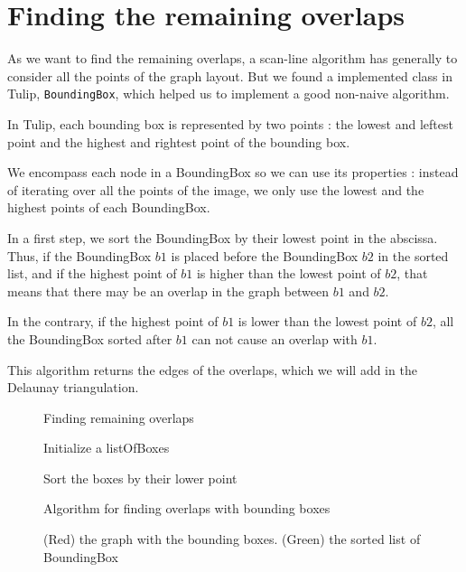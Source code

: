 \documentclass[12pt]{report}
\begin{document}
\section{Finding the remaining overlaps}
As we want to find the remaining overlaps, a scan-line algorithm has generally to consider all the points of the graph layout. But we found a implemented class in Tulip, \texttt{BoundingBox}, which helped us to implement a good non-naive algorithm. 

\bigskip
In Tulip, each bounding box is represented by two points : the lowest and leftest point and the highest and rightest point of the bounding box.

We encompass each node in a BoundingBox so we can use its properties : instead of iterating over all the points of the image, we only use the lowest and the highest points of each BoundingBox. 

\bigskip
In a first step, we sort the BoundingBox by their lowest point in the abscissa. Thus, if the BoundingBox $b1$ is placed before the BoundingBox $b2$ in the sorted list, and if the highest point of $b1$ is higher than the lowest point of $b2$, that means that there may be an overlap in the graph between $b1$ and $b2$. 

In the contrary, if the highest point of $b1$ is lower than the lowest point of $b2$, all the BoundingBox sorted after $b1$ can not cause an overlap with $b1$.

\bigskip
This algorithm returns the edges of the overlaps, which we will add in the Delaunay triangulation.

\begin{figure}
\begin{algorithm}[H]
\caption{Finding remaining overlaps}
Initialize a listOfBoxes

Sort the boxes by their lower point

	{}
\end{algorithm}
\caption{Algorithm for finding overlaps with bounding boxes}
\label{algscanline}
\end{figure}

\begin{figure}[h]
  \center
  \setlength\fboxsep{5pt}
  \setlength\fboxrule{0.5pt}
  \caption{(Red) the graph with the bounding boxes. (Green) the sorted list of BoundingBox}
  \label{scanline}
\end{figure}
\end{document}

